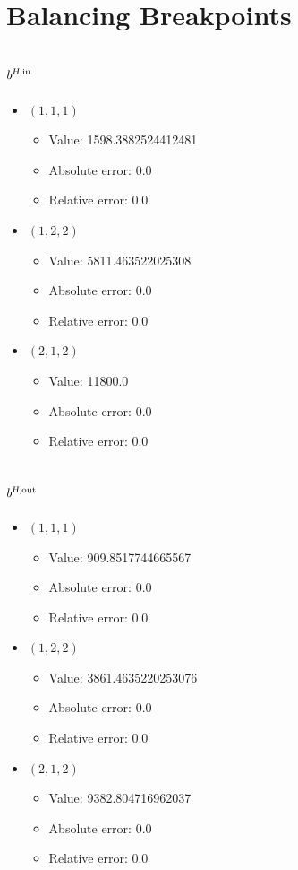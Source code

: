 \documentclass{article}%
\begin{document}
\section{Balancing Breakpoints}%
\subsection{$b^{\textsl{H},\text{in}}$}%
\begin{itemize}%
	\item $(1, 1, 1)$%
	\begin{itemize}%
		\item Value: 1598.3882524412481%
		\item Absolute error: 0.0%
		\item Relative error: 0.0%
	\end{itemize}%
	\item $(1, 2, 2)$%
	\begin{itemize}%
		\item Value: 5811.463522025308%
		\item Absolute error: 0.0%
		\item Relative error: 0.0%
	\end{itemize}%
	\item $(2, 1, 2)$%
	\begin{itemize}%
		\item Value: 11800.0%
		\item Absolute error: 0.0%
		\item Relative error: 0.0%
	\end{itemize}%
\end{itemize}%
\subsection{$b^{\textsl{H},\text{out}}$}%
\begin{itemize}%
	\item $(1, 1, 1)$%
	\begin{itemize}%
		\item Value: 909.8517744665567%
		\item Absolute error: 0.0%
		\item Relative error: 0.0%
	\end{itemize}%
	\item $(1, 2, 2)$%
	\begin{itemize}%
		\item Value: 3861.4635220253076%
		\item Absolute error: 0.0%
		\item Relative error: 0.0%
	\end{itemize}%
	\item $(2, 1, 2)$%
	\begin{itemize}%
		\item Value: 9382.804716962037%
		\item Absolute error: 0.0%
		\item Relative error: 0.0%
	\end{itemize}%
\end{itemize}%
\end{document}
